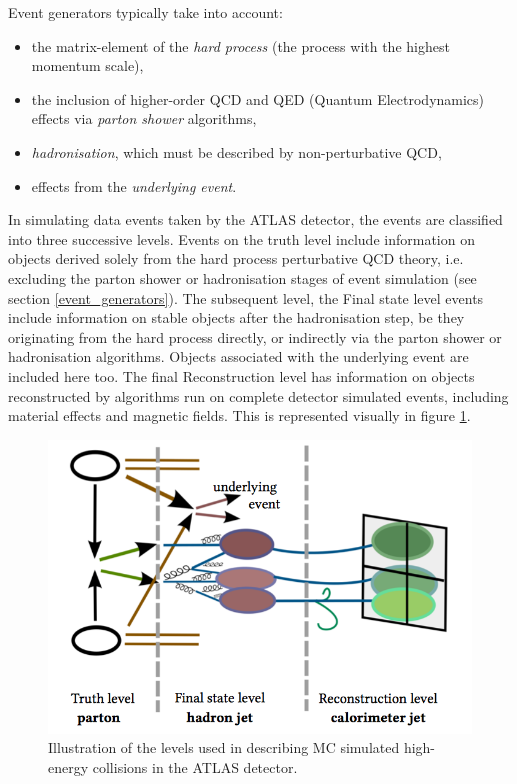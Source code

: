 Event generators typically take into account:
\begin{itemize}
\item the matrix-element of the \emph{hard process} (the process with the highest momentum scale),
\item the inclusion of higher-order QCD and QED (Quantum Electrodynamics) effects via \emph{parton shower} algorithms,
\item \emph{hadronisation}, which must be described by non-perturbative QCD,
\item effects from the \emph{underlying event}.
\end{itemize}

In simulating data events taken by the ATLAS detector, the events are classified into three successive levels. Events on the truth level include information on objects derived solely from the hard process perturbative QCD theory, i.e. excluding the parton shower or hadronisation stages of event simulation (see section \ref{event_generators}). The subsequent level, the Final state level events include information on stable objects after the hadronisation step, be they originating from the hard process directly, or indirectly via the parton shower or hadronisation algorithms. Objects associated with the underlying event are included here too. The final Reconstruction level has information on objects reconstructed by algorithms run on complete detector simulated events, including material effects and magnetic fields. This is represented visually in figure \ref{mc_levels}.
\begin{figure}
\centering
\includegraphics[scale=0.5]{images/sim_levels}
\caption{Illustration of the levels used in describing MC simulated high-energy collisions in the ATLAS detector. \cite{schnoor_thesis}}
\label{mc_levels}
\end{figure}
